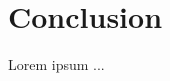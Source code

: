 \documentclass[shortpaper]{revdetua}
\begin{document}



\section{Conclusion}

Lorem ipsum ...


 

\end{document}
